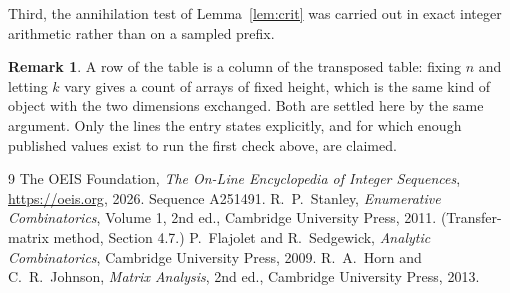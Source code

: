 \documentclass[11pt,a4paper]{article}
\theoremstyle{plain}
\theoremstyle{definition}
\newtheorem{remark}[theorem]{Remark}
\begin{document}
Third, the annihilation test of Lemma~\ref{lem:crit} was carried out in exact integer
arithmetic rather than on a sampled prefix.

\begin{remark}
A row of the table is a column of the transposed table: fixing $n$ and letting $k$ vary gives a
count of arrays of fixed height, which is the same kind of object with the two dimensions
exchanged. Both are settled here by the same argument. Only the lines the entry states
explicitly, and for which enough published values exist to run the first check above, are
claimed.
\end{remark}

\begin{thebibliography}{9}
 The OEIS Foundation, \emph{The On-Line Encyclopedia of Integer
Sequences}, \url{https://oeis.org}, 2026. Sequence A251491.
 R.~P.~Stanley, \emph{Enumerative Combinatorics}, Volume 1, 2nd ed.,
Cambridge University Press, 2011. (Transfer-matrix method, Section 4.7.)
 P.~Flajolet and R.~Sedgewick, \emph{Analytic Combinatorics}, Cambridge
University Press, 2009.
 R.~A.~Horn and C.~R.~Johnson, \emph{Matrix Analysis}, 2nd ed., Cambridge
University Press, 2013.
\end{thebibliography}
\end{document}
